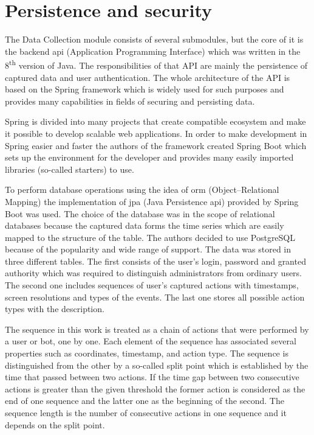 \section{Persistence and security}\label{sec:persistence-and-security}
The Data Collection module consists of several submodules, but the core of it is the backend \gls{api} (Application Programming Interface) which was written in the 8\textsuperscript{th} version of Java.
The responsibilities of that API are mainly the persistence of captured data and user authentication.
The whole architecture of the API is based on the Spring framework which is widely used for such purposes and provides many capabilities in fields of securing and persisting data.

Spring is divided into many projects that create compatible ecosystem and make it possible to develop scalable web applications.
In order to make development in Spring easier and faster the authors of the framework created Spring Boot which sets up the environment for the developer and provides many easily imported libraries (so-called starters) to use.

To perform database operations using the idea of \gls{orm} (Object–Relational Mapping) the implementation of \gls{jpa} (Java Persistence \gls{api}) provided by Spring Boot was used.
The choice of the database was in the scope of relational databases because the captured data forms the time series which are easily mapped to the structure of the table.
The authors decided to use PostgreSQL because of the popularity and wide range of support.
The data was stored in three different tables.
The first consists of the user's login, password and granted authority which was required to distinguish administrators from ordinary users.
The second one includes sequences of user's captured actions with timestamps, screen resolutions and types of the events.
The last one stores all possible action types with the description.

The sequence in this work is treated as a chain of actions that were performed by a user or bot, one by one.
Each element of the sequence has associated several properties such as coordinates, timestamp, and action type.
The sequence is distinguished from the other by a so-called split point which is established by the time that passed between two actions.
If the time gap between two consecutive actions is greater than the given threshold the former action is considered as the end of one sequence and the latter one as the beginning of the second.
The sequence length is the number of consecutive actions in one sequence and it depends on the split point.


